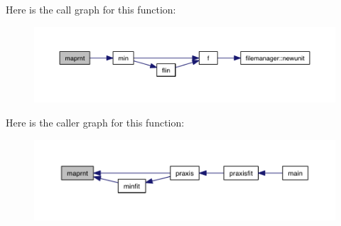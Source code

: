 Here is the call graph for this function\-:
\nopagebreak
\begin{figure}[H]
\begin{center}
\leavevmode
\includegraphics[width=350pt]{praxis_8f_ac6663bade5f6b02f5bc8c05767d38027_cgraph}
\end{center}
\end{figure}




Here is the caller graph for this function\-:
\nopagebreak
\begin{figure}[H]
\begin{center}
\leavevmode
\includegraphics[width=350pt]{praxis_8f_ac6663bade5f6b02f5bc8c05767d38027_icgraph}
\end{center}
\end{figure}


